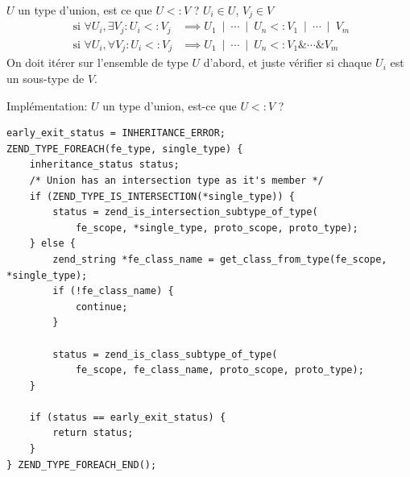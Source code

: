 \documentclass[10pt]{beamer}
\newcommand{\union}{\:\mathrel{|}\:}
\newcommand{\inter}{\mathrel{\&}}
\newcommand{\mif}{\text{ si }}
\newcommand{\subtype}{\mathrel{<:}}
\begin{document}
\begin{frame}{$U$ un type d'union, est ce que $U \subtype V$ ?}
    $U_i \in U$, $V_j \in V$
    \begin{align}
        \mif\forall U_i, \exists V_j : U_i \subtype V_j & \implies U_1\union\cdots\union U_n \subtype V_1\union\cdots\union V_m \\
        \mif\forall U_i, \forall V_j : U_i \subtype V_j & \implies U_1\union\cdots\union U_n \subtype V_1\inter\cdots\inter V_m
    \end{align}
    On doit itérer sur l'ensemble de type $U$ d'abord, et juste vérifier si chaque $U_i$ est un sous-type de $V$. 
\end{frame}
\begin{frame}[fragile]{Implémentation: $U$ un type d'union, est-ce que $U \subtype V$ ?}
    \begin{verbatim}
early_exit_status = INHERITANCE_ERROR;
ZEND_TYPE_FOREACH(fe_type, single_type) {
    inheritance_status status;
    /* Union has an intersection type as it's member */
    if (ZEND_TYPE_IS_INTERSECTION(*single_type)) {
        status = zend_is_intersection_subtype_of_type(
            fe_scope, *single_type, proto_scope, proto_type);
    } else {
        zend_string *fe_class_name = get_class_from_type(fe_scope, *single_type);
        if (!fe_class_name) {
            continue;
        }

        status = zend_is_class_subtype_of_type(
            fe_scope, fe_class_name, proto_scope, proto_type);
    }

    if (status == early_exit_status) {
        return status;
    }
} ZEND_TYPE_FOREACH_END();
    \end{verbatim}
\end{frame}
\end{document}
